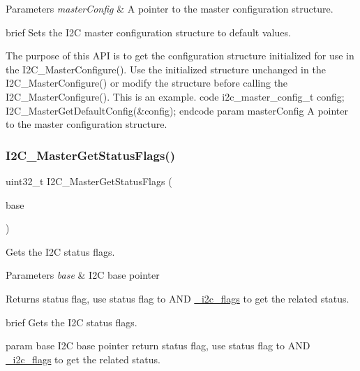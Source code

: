 \begin{DoxyParams}{Parameters}
{\em master\+Config} & A pointer to the master configuration structure.\\
\hline
\end{DoxyParams}
brief Sets the I2C master configuration structure to default values.

The purpose of this A\+PI is to get the configuration structure initialized for use in the I2\+C\+\_\+\+Master\+Configure(). Use the initialized structure unchanged in the I2\+C\+\_\+\+Master\+Configure() or modify the structure before calling the I2\+C\+\_\+\+Master\+Configure(). This is an example. code i2c\+\_\+master\+\_\+config\+\_\+t config; I2\+C\+\_\+\+Master\+Get\+Default\+Config(\&config); endcode param master\+Config A pointer to the master configuration structure. \mbox{\label{group__i2c__driver_ga721e41295dedc83b424e80e53065e625}} 
\subsubsection{\texorpdfstring{I2C\_MasterGetStatusFlags()}{I2C\_MasterGetStatusFlags()}}
{\footnotesize\ttfamily uint32\+\_\+t I2\+C\+\_\+\+Master\+Get\+Status\+Flags (\begin{DoxyParamCaption}\item[{\mbox{\hyperlink{struct_i2_c___type}{I2\+C\+\_\+\+Type}} $\ast$}]{base }\end{DoxyParamCaption})}



Gets the I2C status flags. 


\begin{DoxyParams}{Parameters}
{\em base} & I2C base pointer \\
\hline
\end{DoxyParams}
\begin{DoxyReturn}{Returns}
status flag, use status flag to A\+ND \mbox{\hyperlink{group__i2c__driver_ga1f1337bbe9d0b184d9dcee31f9ebade2}{\+\_\+i2c\+\_\+flags}} to get the related status.
\end{DoxyReturn}
brief Gets the I2C status flags.

param base I2C base pointer return status flag, use status flag to A\+ND \mbox{\hyperlink{group__i2c__driver_ga1f1337bbe9d0b184d9dcee31f9ebade2}{\+\_\+i2c\+\_\+flags}} to get the related status. \mbox{\label{group__i2c__driver_ga29f967b3ae8487a36ba2a58deb01ccae}} 
